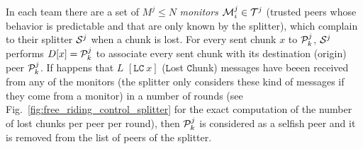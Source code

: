 In each team there are a set of $M^j\leq N$ \emph{monitors} ${\cal
M}^j_i\in {\cal T}^j$ (trusted peers whose behavior is predictable and
that are only known by the splitter), which complain to their splitter
${\cal S}^j$ when a chunk is lost. For every sent chunk $x$ to ${\cal
P}^j_k$, ${\cal S}^j$ performs $D[x]={\cal P}^j_k$ to associate every
sent chunk with its destination (origin) peer ${\cal P}^j_k$. If
happens that $L$ $[\mathtt{LC}~x]$ ($\mathtt{L}$ost $\mathtt{C}$hunk)
messages have beeen received from any of the monitors (the splitter
only considers these kind of messages if they come from a monitor) in
a number of rounds (see Fig.~\ref{fig:free_riding_control_splitter}
for the exact computation of the number of lost chunks per peer per
round), then ${\cal P}^j_k$ is considered as a selfish peer and it is
removed from the list of peers of the splitter.

